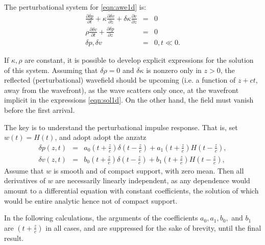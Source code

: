 
The perturbational system for \ref{eqn:awe1d} is:
\begin{eqnarray}
\label{eqn:dawe1d}
\frac{\partial \delta p}{\partial t} +\kappa\frac{\partial
  \delta v}{\partial z} + \delta \kappa\frac{\partial
  v}{\partial z} &=& 0 \nonumber\\
\rho \frac{\partial \delta v}{\partial t} + \frac{\partial \delta p}{\partial
  z}&=&0\nonumber\\
\delta p,\delta v&=&0, t \ll 0.
\end{eqnarray}

If $\kappa, \rho $ are constant, it is possible to develop explicit
expressions for the solution of this system. Assuming that $\delta
\rho=0$ and $\delta \kappa$ is nonzero only in $z>0$, the reflected
(perturbational) wavefield should be upcoming (i.e. a function of
$z+ct$, away from the wavefront), as the wave scatters
only once, at the wavefront implicit in the expressions
\ref{eqn:sol1d}. On the other hand, the field must vanish before the
first arrival. 

The key is to understand the perturbational impulse response. That is,
set $w(t)=H(t)$, and adopt adopt the anzatz
\begin{eqnarray}
\label{eqn:ansatz1d}
\delta p(z,t) &=& a_0\left(t + \frac{z}{c}\right) \delta\left(t -
  \frac{z}{c}\right) + a_1\left(t + \frac{z}{c}\right) H\left(t -
  \frac{z}{c}\right),\nonumber\\
\delta v(z,t) &=& b_0\left(t + \frac{z}{c}\right) \delta\left(t -
  \frac{z}{c}\right) + b_1\left(t + \frac{z}{c}\right) H\left(t -
  \frac{z}{c}\right),
\end{eqnarray}
Assume that $w$ is smooth and
of compact support, with zero mean. Then all derivatives of $w$ are
necessarily linearly independent, as any dependence would amount to a
differential equation with constant coefficients, the solution of
which would be entire analytic hence not of compact support.

In the following calculations, the arguments of the coefficients
$a_0,a_1,b_0,$ and $b_1$ are $\left(t + \frac{z}{c}\right)$ in all
cases, and are suppressed for the sake of brevity, until the final result.

